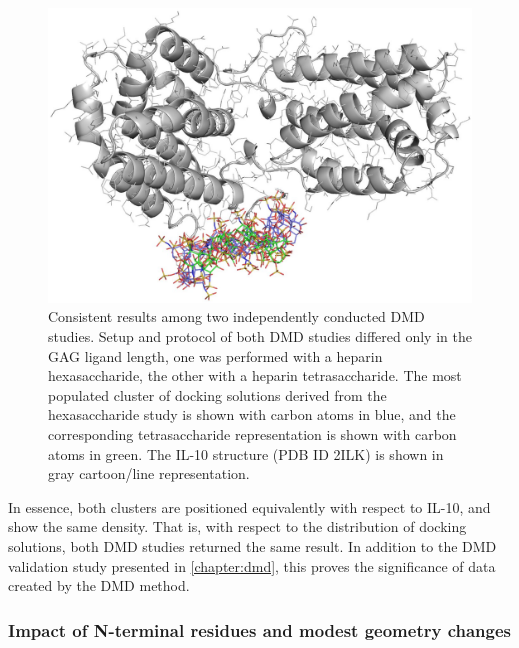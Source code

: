 \begin{figure}
\centering
\includegraphics[width=1.0\textwidth]{gfx/dmdil10/hp_hexa_vs_tetra_clusters_position_match_cropped.jpg}
\caption[]{Consistent results among two independently conducted DMD studies.
Setup and protocol of both DMD studies differed only in the GAG ligand length,
one was performed with a heparin hexasaccharide, the other with a heparin
tetrasaccharide. The most populated cluster of docking solutions derived from
the hexasaccharide study is shown with carbon atoms in blue, and the
corresponding tetrasaccharide representation is shown with carbon atoms in
green. The IL-10 structure (PDB ID 2ILK) is shown in gray cartoon/line
representation.}
\label{fig:dmdil10:hp_hexa_vs_tetra_clusters_position_match}
\end{figure}

In essence, both clusters are positioned equivalently with respect to IL-10, and
show the same density. That is, with respect to the distribution of docking
solutions, both DMD studies returned the same result. In addition to the DMD
validation study presented in \cref{chapter:dmd}, this proves the significance
of data created by the DMD method.


\subsubsection{Impact of N-terminal residues and modest geometry changes}

